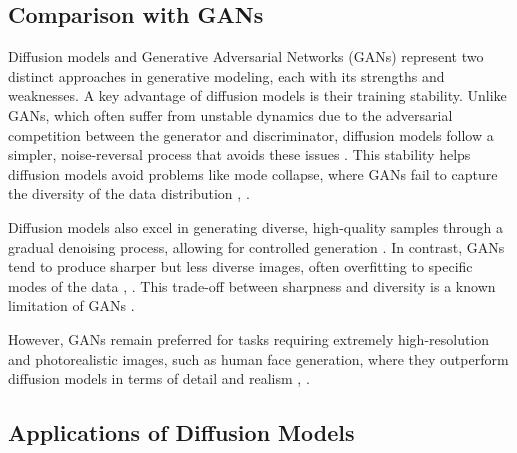 \subsection{Comparison with GANs}

Diffusion models and Generative Adversarial Networks (GANs) represent two distinct approaches in generative modeling, each with its strengths and weaknesses. A key advantage of diffusion models is their training stability. Unlike GANs, which often suffer from unstable dynamics due to the adversarial competition between the generator and discriminator, diffusion models follow a simpler, noise-reversal process that avoids these issues \citep{10.1109/access.2023.3272032}. This stability helps diffusion models avoid problems like mode collapse, where GANs fail to capture the diversity of the data distribution \citep{10.1049/ipr2.12487}, \citep{10.3390/e25121657}.

Diffusion models also excel in generating diverse, high-quality samples through a gradual denoising process, allowing for controlled generation \citep{10.1117/1.jei.32.4.043029}. In contrast, GANs tend to produce sharper but less diverse images, often overfitting to specific modes of the data \citep{10.48550/arxiv.1910.04302}, \citep{10.48550/arxiv.2207.01561}. This trade-off between sharpness and diversity is a known limitation of GANs \citep{10.1111/rssb.12476}.

However, GANs remain preferred for tasks requiring extremely high-resolution and photorealistic images, such as human face generation, where they outperform diffusion models in terms of detail and realism \citep{10.54254/2755-2721/18/20230984}, \citep{10.3390/e22091055}.

\subsection{Applications of Diffusion Models}

